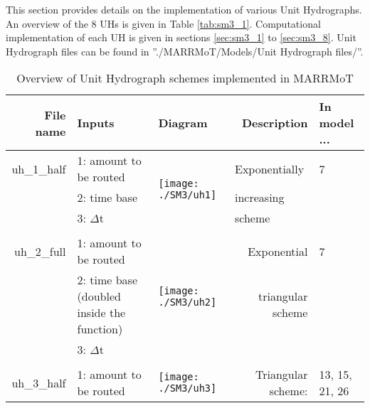 This section provides details on the implementation of various Unit Hydrographs. An overview of the 8 UHs is given in Table \ref{tab:sm3_1}. Computational implementation of each UH is given in sections \ref{sec:sm3_1} to \ref{sec:sm3_8}. Unit Hydrograph files can be found in ''./MARRMoT/Models/Unit Hydrograph files/''.

\begin{table}[ht!]
  \centering
  \caption{Overview of Unit Hydrograph schemes implemented in MARRMoT}
\hspace*{-5em}    
\begin{tabular}{rp{10.57em}lrl}
    \toprule
    \multicolumn{1}{p{6.215em}}{\textbf{File name}} & \textbf{Inputs} & \multicolumn{1}{p{8.645em}}{\textbf{Diagram}} & \multicolumn{1}{p{8.43em}}{\textbf{Description }} & \multicolumn{1}{p{6.07em}}{\textbf{In model ...}} \\
    \midrule
    \multicolumn{1}{p{6.215em}}{uh\_1\_half} & 1: amount to be routed & \multirow{3}[1]{*}{ \begin{minipage}{3cm} \texttt{[image: ./SM3/uh1]} \end{minipage}} & \multicolumn{1}{l}{Exponentially} & 7 \\
          & 2: time base &       & \multicolumn{1}{l}{increasing} &  \\
          & 3: $\Delta$t &       & \multicolumn{1}{l}{scheme} &  \\
          & \multicolumn{1}{l}{} &       &       &  \\
    \multicolumn{1}{p{6.215em}}{uh\_2\_full} & 1: amount to be routed & \multirow{3}[0]{*}{ \begin{minipage}{3cm} \texttt{[image: ./SM3/uh2]} \end{minipage} } & \multicolumn{1}{p{8.43em}}{Exponential} & 7 \\
          & 2: time base (doubled inside the function) &       & \multicolumn{1}{p{8.43em}}{triangular scheme} &  \\
          & 3: $\Delta$t &       &       &  \\
          & \multicolumn{1}{l}{} &       &       &  \\
    \multicolumn{1}{p{6.215em}}{uh\_3\_half} & 1: amount to be routed & \multirow{3}[0]{*}{ \begin{minipage}{3cm} \texttt{[image: ./SM3/uh3]} \end{minipage} } & \multicolumn{1}{p{8.43em}}{Triangular scheme:} & \multicolumn{1}{p{6.07em}}{13, 15, 21, 26} \\

\end{tabular}
\end{table}
